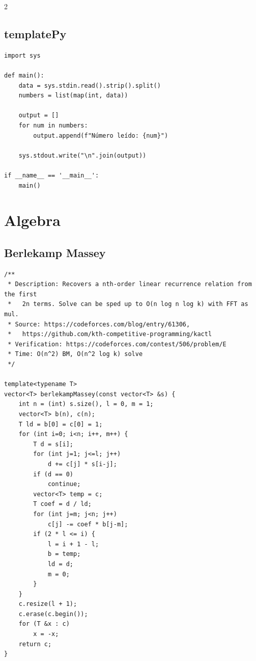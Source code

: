 \documentclass[twoside]{article}
\begin{document}
\begin{multicols*}{2}
	{
		\subsection*{templatePy}
	}
	\begin{verbatim}
import sys

def main():
    data = sys.stdin.read().strip().split()
    numbers = list(map(int, data))
    
    output = []
    for num in numbers:
        output.append(f"Número leído: {num}")
    
    sys.stdout.write("\n".join(output))

if __name__ == '__main__':
    main()

\end{verbatim}

	{
		\section*{Algebra}
	}
	{
		\subsection*{Berlekamp Massey}
	}
	\begin{verbatim}
/**
 * Description: Recovers a nth-order linear recurrence relation from the first
 *   2n terms. Solve can be sped up to O(n log n log k) with FFT as mul.
 * Source: https://codeforces.com/blog/entry/61306,
 *   https://github.com/kth-competitive-programming/kactl
 * Verification: https://codeforces.com/contest/506/problem/E
 * Time: O(n^2) BM, O(n^2 log k) solve
 */

template<typename T>
vector<T> berlekampMassey(const vector<T> &s) {
    int n = (int) s.size(), l = 0, m = 1;
    vector<T> b(n), c(n);
    T ld = b[0] = c[0] = 1;
    for (int i=0; i<n; i++, m++) {
        T d = s[i];
        for (int j=1; j<=l; j++)
            d += c[j] * s[i-j];
        if (d == 0)
            continue;
        vector<T> temp = c;
        T coef = d / ld;
        for (int j=m; j<n; j++)
            c[j] -= coef * b[j-m];
        if (2 * l <= i) {
            l = i + 1 - l;
            b = temp;
            ld = d;
            m = 0;
        }
    }
    c.resize(l + 1);
    c.erase(c.begin());
    for (T &x : c)
        x = -x;
    return c;
}


\end{verbatim}
\end{multicols*}
\end{document}

